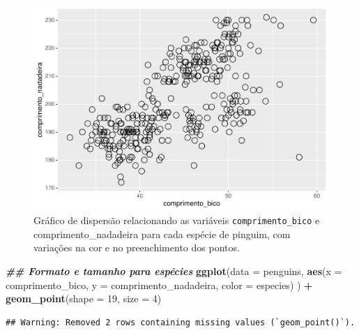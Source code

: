 \documentclass[
]{article}
\newenvironment{Shaded}{\begin{snugshade}}{\end{snugshade}}
\newcommand{\AttributeTok}[1]{\textcolor[rgb]{0.13,0.29,0.53}{#1}}
\newcommand{\DecValTok}[1]{\textcolor[rgb]{0.00,0.00,0.81}{#1}}
\newcommand{\DocumentationTok}[1]{\textcolor[rgb]{0.56,0.35,0.01}{\textbf{\textit{#1}}}}
\newcommand{\FunctionTok}[1]{\textcolor[rgb]{0.13,0.29,0.53}{\textbf{#1}}}
\newcommand{\NormalTok}[1]{#1}
\newcommand{\SpecialCharTok}[1]{\textcolor[rgb]{0.81,0.36,0.00}{\textbf{#1}}}
\begin{document}
\begin{figure}
\centering
\includegraphics{epr_files/figure-latex/fig-scatter-shape-1.pdf}
\caption{\label{fig:fig-scatter-shape-1}Gráfico de dispersão relacionando as variáveis \texttt{comprimento\_bico} e comprimento\_nadadeira para cada espécie de pinguim, com variações na cor e no preenchimento dos pontos.}
\end{figure}

\begin{Shaded}
\begin{Highlighting}[]
\DocumentationTok{\#\# Formato e tamanho para espécies}
\FunctionTok{ggplot}\NormalTok{(}\AttributeTok{data =}\NormalTok{ penguins, }
       \FunctionTok{aes}\NormalTok{(}\AttributeTok{x =}\NormalTok{ comprimento\_bico, }\AttributeTok{y =}\NormalTok{ comprimento\_nadadeira, }\AttributeTok{color =}\NormalTok{ especies)}
\NormalTok{       ) }\SpecialCharTok{+}
    \FunctionTok{geom\_point}\NormalTok{(}\AttributeTok{shape =} \DecValTok{19}\NormalTok{, }\AttributeTok{size =} \DecValTok{4}\NormalTok{)}
\end{Highlighting}
\end{Shaded}

\begin{verbatim}
## Warning: Removed 2 rows containing missing values (`geom_point()`).
\end{verbatim}
\end{document}
